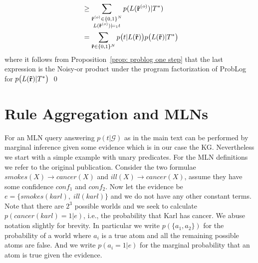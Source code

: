 \documentclass{article}
\theoremstyle{plain}
\theoremstyle{remark}
\newcommand{\vecallrules}{\mathbf{\Tilde{r}}}
\newcommand{\triple}{t}
\newcommand{\alltriples}{\mathcal{G}}
\begin{document}
{\begin{align*}
      &\geq \sum\limits_{\substack{\vecallrules^{(o)} \in \{0,1\}^N  \\  L(\vecallrules^{(o)}) \models_1 t } } p(L(\vecallrules^{(o)})|T^*)\\
      &= \sum_{\vecallrules \in \{0,1\}^N} p\big(t | L(\vecallrules) \big)p\big(L(\vecallrules)|T^*\big)
\end{align*}
where it follows from Proposition~\ref{prop: problog one step} that the last expression is the Noisy-or product under the program factorization of ProbLog for $p\big(L(\vecallrules)|T^*\big)$ \qed


\section{Rule Aggregation and MLNs}
For an MLN query answering $p(\triple | \alltriples)$ as in the main text can be performed by marginal inference given some evidence which is in our case the KG. Nevertheless we start with a simple example with unary predicates. For the MLN definitions we refer to the original publication. Consider the two formulae $smokes(X) \rightarrow cancer(X)$ and $ill(X) \rightarrow cancer(X)$, assume they have some confidence $conf_1$ and $conf_2$. Now let the evidence be $e=\{smokes(karl), \; ill(karl)\}$ and we do not have any other constant terms. Note that there are $2^3$ possible worlds and we seek to calculate $p(cancer(karl){=}1| e)$, i.e., the probability that Karl has cancer. We abuse notation slightly for brevity. In particular we write $p(\{ a_1, a_2\})$ for the probability of a world where $a_i$ is a true atom and all the remaining possible atoms are false. And we write $p(a_i{=}1 | e)$ for the marginal probability that an atom is true given the evidence.

}
\end{document}
